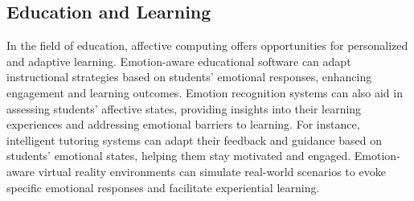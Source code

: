 \subsection{Education and Learning}
In the field of education, affective computing offers opportunities for personalized and adaptive learning. 
Emotion-aware educational software can adapt instructional strategies based on students' emotional responses, enhancing engagement and learning outcomes. 
Emotion recognition systems can also aid in assessing students' affective states, providing insights into their learning experiences and addressing emotional barriers to learning. 
For instance, intelligent tutoring systems can adapt their feedback and guidance based on students' emotional states, helping them stay motivated and engaged. 
Emotion-aware virtual reality environments can simulate real-world scenarios to evoke specific emotional responses and facilitate experiential learning.